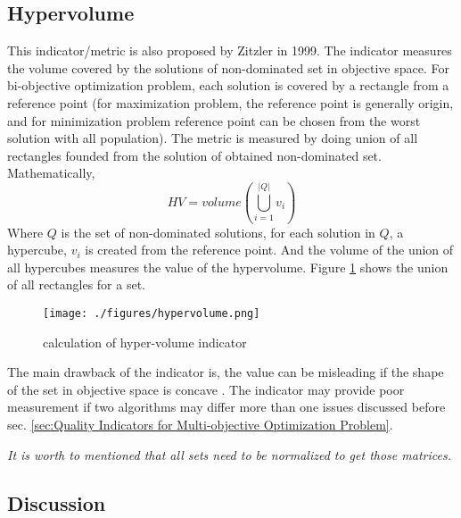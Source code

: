 \documentclass{article}
\begin{document}
\subsection{Hypervolume}
This indicator/metric is also proposed by Zitzler \cite{zitzler_multiobjective_1999} in 1999. 
The indicator measures the volume covered by the solutions of non-dominated set in objective space. 
For bi-objective optimization problem, each solution is covered by a rectangle from a reference point (for maximization problem, the reference point is generally origin, and for minimization problem reference point can be chosen from the worst solution with all population). 
The metric is measured by doing union of all rectangles founded from the solution of obtained non-dominated set. 
Mathematically,
\begin{equation}
HV=volume \left( \bigcup_{i=1}^{|Q|} v_i \right)
\end{equation}
Where $Q$ is the set of non-dominated solutions, for each solution in $Q$, a hypercube, $v_i$ is created from the reference point. 
And the volume of the union of all hypercubes measures the value of the hypervolume.
Figure  \ref{fig:hypervolume} shows the union of all rectangles for a set.

\begin{figure}
\centering

\texttt{[image: ./figures/hypervolume.png]}
\caption{calculation of hyper-volume indicator}
\label{fig:hypervolume}
\end{figure}

The main drawback of the indicator is, the value can be misleading if the shape of the set in objective space is concave \cite{sarker_assessment_2002}. 
The indicator may provide poor measurement if two algorithms may differ more than one issues discussed before sec. \ref{sec:Quality Indicators for Multi-objective Optimization Problem}.   

\textit{It is worth to mentioned that all sets need to be normalized to get those matrices. 
}

\subsection{Discussion}
\end{document}
